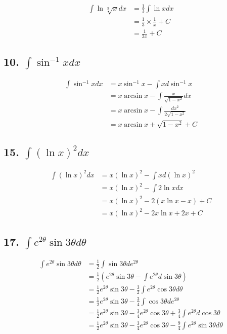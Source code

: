\documentclass{article}
\begin{document}
    $$\begin{aligned}
        \int \ln \sqrt[3]{x} dx &= \frac 1 3 \int \ln x dx \\
        &= \frac 1 3 \times \frac 1 x + C \\
        &= \frac{1}{3x} + C
    \end{aligned}$$

    \subsection*{10. $\int \sin^{-1} x dx $}

    $$\begin{aligned}
        \int \sin^{-1} x dx &= x \sin^{-1}x - \int x d \sin^{-1} x \\
        &= x\arcsin x - \int \frac{x}{\sqrt{1 - x^2}} dx \\
        &= x \arcsin x - \int \frac{dx^2}{2\sqrt{1 - x^2}} \\
        &= x \arcsin x + \sqrt{1 - x^2} + C
    \end{aligned}$$
    
    \subsection*{15. $\int (\ln x)^2 dx$}

    $$\begin{aligned}
        \int (\ln x)^2 dx &= x (\ln x)^2 - \int x d(\ln x)^2 \\
        &= x(\ln x)^2 - \int 2 \ln x dx \\
        &= x(\ln x)^2 - 2(x \ln x - x) + C \\
        &= x(\ln x)^2 - 2x \ln x + 2x + C
    \end{aligned}$$

    \subsection*{17. $\int e^{2\theta} \sin 3\theta d\theta$}

    $$\begin{aligned}
        \int e^{2\theta} \sin 3\theta d\theta &= \frac 1 2 \int \sin 3\theta de^{2\theta} \\
        &= \frac 1 2  (e^{2\theta}\sin 3\theta  - \int e^{2\theta} d \sin 3\theta) \\
        &= \frac 1 2 e^{2\theta} \sin 3\theta - \frac 3 2 \int e^{2\theta}\cos 3\theta d\theta \\
        &= \frac 1 2 e^{2\theta} \sin 3\theta - \frac 3 4 \int \cos 3\theta de^{2\theta} \\
        &= \frac 1 2 e^{2\theta} \sin 3\theta - \frac 3 4 e^{2\theta} \cos 3\theta + \frac 3 4 \int e^{2\theta} d \cos 3\theta \\
        &= \frac 1 2 e^{2\theta} \sin 3\theta - \frac 3 4 e^{2\theta} \cos 3\theta - \frac 9 4 \int e^{2\theta} \sin 3\theta d\theta \\
    \end{aligned}$$
\end{document}
